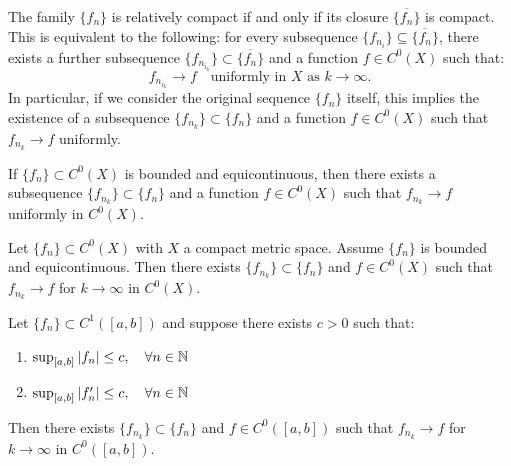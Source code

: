 The family \(\{f_n\}\) is relatively compact if and only if its closure \(\overline{\{f_n\}}\) is compact. This is equivalent to the following: for every subsequence \(\{f_{n_i}\} \subseteq \overline{\{f_n\}}\), there exists a further subsequence \(\{f_{n_{i_k}}\} \subset \overline{\{f_n\}}\) and a function \(f \in C^0(X)\) such that:
\[
f_{n_{i_k}} \to f \quad \text{uniformly in } X \text{ as } k \to \infty.
\]
In particular, if we consider the original sequence \(\{f_n\}\) itself, this implies the existence of a subsequence \(\{f_{n_k}\} \subset \{f_n\}\) and a function \(f \in C^0(X)\) such that \(f_{n_k} \to f\) uniformly.


\begin{corollary}
If \(\{f_n\} \subset C^0(X)\) is bounded and equicontinuous, then there exists a subsequence \(\{f_{n_k}\} \subset \{f_n\}\) and a function \(f \in C^0(X)\) such that \(f_{n_k} \to f\) uniformly in \(C^0(X)\).
\end{corollary}

\begin{corollary}
Let $\{f_n\} \subset C^0(X)$ with $X$ a compact metric space. Assume $\{f_n\}$ is bounded and equicontinuous. Then there exists $\{f_{n_k}\} \subset \{f_n\}$ and $f \in C^0(X)$ such that $f_{n_k} \to f$ for $k \to \infty$ in $C^0(X)$.
\end{corollary}

\clearpage
\begin{corollary}
Let $\{f_n\} \subset C^1([a,b])$ and suppose there exists $c > 0$ such that:
\begin{enumerate}
\item $\sup_{[a,b]} |f_n| \leq c, \quad \forall n \in \mathbb{N}$
\item $\sup_{[a,b]} |f_n'| \leq c, \quad \forall n \in \mathbb{N}$
\end{enumerate}
Then there exists $\{f_{n_k}\} \subset \{f_n\}$ and $f \in C^0([a,b])$ such that $f_{n_k} \to f$ for $k \to \infty$ in $C^0([a,b])$.
\end{corollary}


